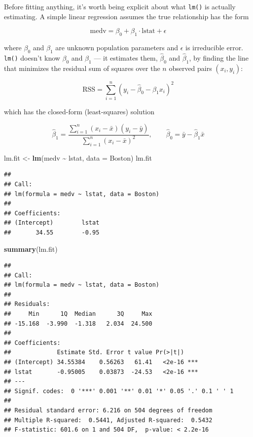 \documentclass[
  11pt,
]{article}
\newenvironment{Shaded}{\begin{snugshade}}{\end{snugshade}}
\newcommand{\AttributeTok}[1]{\textcolor[rgb]{0.13,0.29,0.53}{#1}}
\newcommand{\FunctionTok}[1]{\textcolor[rgb]{0.13,0.29,0.53}{\textbf{#1}}}
\newcommand{\NormalTok}[1]{#1}
\newcommand{\OtherTok}[1]{\textcolor[rgb]{0.56,0.35,0.01}{#1}}
\newcommand{\SpecialCharTok}[1]{\textcolor[rgb]{0.81,0.36,0.00}{\textbf{#1}}}
\begin{document}
Before fitting anything, it's worth being explicit about what
\texttt{lm()} is actually estimating. A simple linear regression assumes
the true relationship has the form

\[
\text{medv} = \beta_0 + \beta_1 \cdot \text{lstat} + \epsilon
\]

where \(\beta_0\) and \(\beta_1\) are unknown population parameters and
\(\epsilon\) is irreducible error. \texttt{lm()} doesn't know
\(\beta_0\) and \(\beta_1\) --- it estimates them, \(\hat\beta_0\) and
\(\hat\beta_1\), by finding the line that minimizes the residual sum of
squares over the \(n\) observed pairs \((x_i, y_i)\):

\[
\text{RSS} = \sum_{i=1}^{n} \left(y_i - \hat\beta_0 - \hat\beta_1 x_i\right)^2
\]

which has the closed-form (least-squares) solution

\[
\hat\beta_1 = \frac{\sum_{i=1}^n (x_i - \bar{x})(y_i - \bar{y})}{\sum_{i=1}^n (x_i - \bar{x})^2}, \qquad
\hat\beta_0 = \bar{y} - \hat\beta_1 \bar{x}
\]

\begin{Shaded}
\begin{Highlighting}[]
\NormalTok{lm.fit }\OtherTok{\textless{}{-}} \FunctionTok{lm}\NormalTok{(medv }\SpecialCharTok{\textasciitilde{}}\NormalTok{ lstat, }\AttributeTok{data =}\NormalTok{ Boston)}
\NormalTok{lm.fit}
\end{Highlighting}
\end{Shaded}

\begin{verbatim}
## 
## Call:
## lm(formula = medv ~ lstat, data = Boston)
## 
## Coefficients:
## (Intercept)        lstat  
##       34.55        -0.95
\end{verbatim}

\begin{Shaded}
\begin{Highlighting}[]
\FunctionTok{summary}\NormalTok{(lm.fit)}
\end{Highlighting}
\end{Shaded}

\begin{verbatim}
## 
## Call:
## lm(formula = medv ~ lstat, data = Boston)
## 
## Residuals:
##     Min      1Q  Median      3Q     Max 
## -15.168  -3.990  -1.318   2.034  24.500 
## 
## Coefficients:
##             Estimate Std. Error t value Pr(>|t|)    
## (Intercept) 34.55384    0.56263   61.41   <2e-16 ***
## lstat       -0.95005    0.03873  -24.53   <2e-16 ***
## ---
## Signif. codes:  0 '***' 0.001 '**' 0.01 '*' 0.05 '.' 0.1 ' ' 1
## 
## Residual standard error: 6.216 on 504 degrees of freedom
## Multiple R-squared:  0.5441, Adjusted R-squared:  0.5432 
## F-statistic: 601.6 on 1 and 504 DF,  p-value: < 2.2e-16
\end{verbatim}
\end{document}
